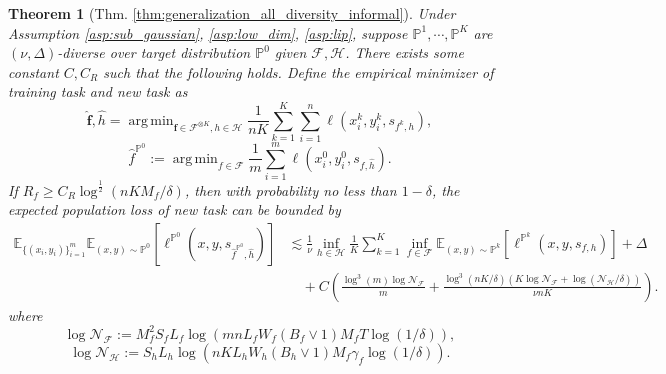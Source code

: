 \documentclass{article}
\numberwithin{equation}{section}
\def\vf{{\bm{f}}}
\newcommand{\E}{\mathbb{E}}
\DeclareMathOperator*{\argmin}{arg\,min}
\newtheorem{thm}{Theorem}[section]
\theoremstyle{definition}
\renewcommand{\P}{\mathbb{P}}
\begin{document}
\begin{thm}[Thm. \ref{thm:generalization_all_diversity_informal}]
\label{thm:generalization_all_diversity}
    Under Assumption \ref{asp:sub_gaussian}, \ref{asp:low_dim}, \ref{asp:lip}, suppose $\P^1,\cdots,\P^K$ are $(\nu,\Delta)$-diverse over target distribution $\P^0$ given $\mathcal{F},\mathcal{H}$.
    There exists some constant $C,C_R$ such that the following holds.
    Define the empirical minimizer of training task and new task as
    \begin{equation}
        \widehat{\vf},\widehat{h}=\argmin_{\vf\in\mathcal{F}^{\otimes K},h\in\mathcal{H}} \frac{1}{nK}\sum_{k=1}^K\sum_{i=1}^n\ell(x_i^k,y_i^k,s_{f^k,h}),
    \end{equation}
    \begin{equation}
        \widehat{f}^{\P^0}:= \argmin_{f\in\mathcal{F}} \frac{1}{m}\sum_{i=1}^m \ell(x_i^0,y_i^0,s_{f,\widehat{h}}).
    \end{equation}
    If $R_f\geq C_R\log^{\frac{1}{2}}(nKM_f/\delta)$,
    then with probability no less than $1-\delta$, the expected population loss of new task can be bounded by
    \begin{equation}
        \begin{aligned}
            \E_{\{(x_i,y_i)\}_{i=1}^m} \E_{(x,y)\sim\P^0} [\ell^{\P^0}(x,y,s_{\widehat{f}^{\P^0},\widehat{h}})]
            &\lesssim \frac{1}{\nu}\inf_{h\in\mathcal{H}} \frac{1}{K}\sum_{k=1}^K \inf_{f\in\mathcal{F}}\E_{(x,y)\sim\P^k} [\ell^{\P^k} (x,y,s_{f,h})] + \Delta \\
            &\quad +C \left(\frac{\log^3(m)\log\mathcal{N}_\mathcal{F}}{m} + \frac{\log^3(nK/\delta)(K\log\mathcal{N}_\mathcal{F}+\log(\mathcal{N}_\mathcal{H}/\delta))}{\nu nK}\right).
        \end{aligned}
    \end{equation}
    where
    \begin{equation}
        \log\mathcal{N}_\mathcal{F}:=M_f^2S_fL_f\log\left(mnL_fW_f(B_f\vee 1)M_fT\log(1/\delta)\right),
    \end{equation}
    \begin{equation}
        \log\mathcal{N}_\mathcal{H}:=S_hL_h\log\left(nKL_hW_h(B_h\vee 1)M_f\gamma_f\log(1/\delta)\right).
    \end{equation}
\end{thm}
\end{document}
